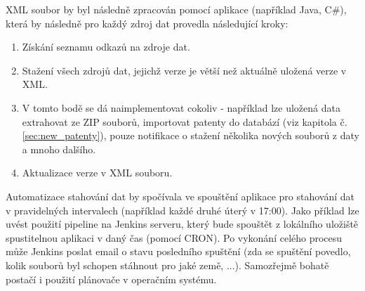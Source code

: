 \noindent \gls{XML} soubor by byl následně zpracován pomocí aplikace (například Java, C\#), která by následně pro každý zdroj dat provedla následující kroky:
\begin{enumerate}
\item Získání seznamu odkazů na zdroje dat.
\item Stažení všech zdrojů dat, jejichž verze je větší než aktuálně uložená verze v \gls{XML}.
\item V tomto bodě se dá naimplementovat cokoliv - například lze uložená data extrahovat ze ZIP souborů, importovat patenty do databází (viz kapitola č. \ref{sec:new_patenty}), pouze notifikace o stažení několika nových souborů z daty a mnoho dalšího.
\item Aktualizace verze v \gls{XML} souboru.
\end{enumerate}
Automatizace stahování dat by spočívala ve spouštění aplikace pro stahování dat v pravidelných intervalech (například každé druhé úterý v 17:00). Jako příklad lze uvést použití pipeline na Jenkins serveru, který bude spouštět z lokálního uložiště spustitelnou aplikaci v daný čas (pomocí CRON). Po vykonání celého procesu může Jenkins poslat email o stavu posledního spuštění (zda se spuštění povedlo, kolik souborů byl schopen stáhnout pro jaké země, ...). Samozřejmě bohatě postačí i použití plánovače v operačním systému.

